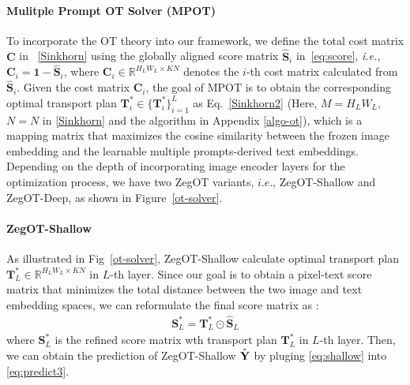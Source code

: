 \documentclass[nohyperref]{article}
\newcommand{\add}[1] {\textcolor{blue}{#1}} %
\newcommand{\bs}{\boldsymbol}
\newcommand{\asty}{\accentset{\ast}{\mathbf{Y}}}
\theoremstyle{plain}
\theoremstyle{definition}
\theoremstyle{remark}
\begin{document}
\paragraph{Mulitple Prompt OT Solver (MPOT)}
To incorporate the OT theory into our framework, we define the total cost matrix $\bs{C}$ in ~\eqref{Sinkhorn} using the globally aligned score matrix $\bs{\hat S}_i$ in~\eqref{eq:score}, \textit{i.e.,} 
{$\bs{C}_i  = \bs{1 - \hat S}_i$,} where $\bs{C}_i \in \mathbb{R}^{H_LW_L \times K N}$ denotes the $i$-th cost matrix calculated from $\bs{\hat S}_i$.
Given the cost matrix $\bs{C}_i$, the goal of MPOT is to obtain the corresponding optimal transport plan $\bs{T}^{\ast}_i  \in \{\bs{T}^{\ast}_i\}^L_{i=1}$ as Eq.~\eqref{Sinkhorn2}  {(Here, $M = H_LW_L$, $N= N$ in \eqref{Sinkhorn} and the algorithm in Appendix \ref{algo-ot})}, which is a mapping matrix that maximizes the cosine similarity between the frozen image embedding and the learnable multiple prompts-derived text embeddings.
Depending on the depth of incorporating image encoder layers for the optimization process, we have two ZegOT variants,  $\textit{i.e.,}$ ZegOT-Shallow and ZegOT-Deep, as shown in Figure~\ref{ot-solver}.

\paragraph{ZegOT-Shallow}
As illustrated in Fig~\ref{ot-solver}, ZegOT-Shallow calculate optimal transport plan $\bs{T}^{\ast}_L \in \mathbb{R}^{H_LW_L \times K N}$ in $L$-{th} layer. 
Since our goal is to obtain a pixel-text score matrix that minimizes the total distance between the two image and text embedding spaces, we can reformulate the final score matrix as : %
\begin{eqnarray}
\bs{S}^{\ast}_L= \bs{T}^{\ast}_L \odot\bs{\hat S}_L
\label{eq:shallow}
\end{eqnarray}
where $\bs{S}^{\ast}_L$ is the refined score matrix wth transport plan $\bs{T}^{\ast}_L$ in $L$-th layer. Then, we can obtain the prediction of ZegOT-Shallow $\asty$ by pluging \eqref{eq:shallow} into \eqref{eq:predict3}.
\end{document}
